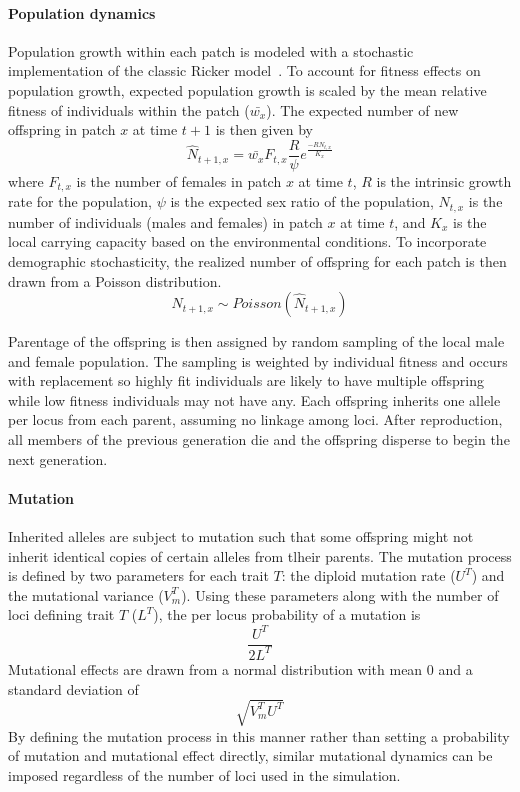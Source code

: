 \documentclass[11pt, oneside]{article}
\begin{document}
\paragraph{Population dynamics}
Population growth within each patch is modeled with a stochastic implementation of the classic Ricker model~\citep{ricker1954stock, melbourne2008extinction}. To account for fitness effects on population growth, expected population growth is scaled by the mean relative fitness of individuals within the patch ($\bar{w_{x}}$). The expected number of new offspring in patch $x$ at time $t+1$ is then given by
\begin{equation}
\hat{N}_{t+1,x}=\bar{w_{x}}F_{t,x}\frac{R}{\psi}e^{\frac{-RN_{t,x}}{K_{x}}}
\end{equation}
where $F_{t,x}$ is the number of females in patch $x$ at time $t$, $R$ is the intrinsic growth rate for the population, $\psi$ is the expected sex ratio of the population, $N_{t,x}$ is the number of individuals (males and females) in patch $x$ at time $t$, and $K_{x}$ is the local carrying capacity based on the environmental conditions. To incorporate demographic stochasticity, the realized number of offspring for each patch is then drawn from a Poisson distribution.
\begin{equation}
N_{t+1,x}\sim Poisson(\hat{N}_{t+1,x})
\end{equation}

Parentage of the offspring is then assigned by random sampling of the local male and female population. The sampling is weighted by individual fitness and occurs with replacement so highly fit individuals are likely to have multiple offspring while low fitness individuals may not have any. Each offspring inherits one allele per locus from each parent, assuming no linkage among loci. After reproduction, all members of the previous generation die and the offspring disperse to begin the next generation.

\paragraph{Mutation}
Inherited alleles are subject to mutation such that some offspring might not inherit identical copies of certain alleles from tlheir parents. The mutation process is defined by two parameters for each trait $T$: the diploid mutation rate ($U^{T}$) and the mutational variance ($V_{m}^{T}$). Using these parameters along with the number of loci defining trait $T$ ($L^{T}$), the per locus probability of a mutation is
\begin{equation}
\frac{U^{T}}{2L^{T}}
\end{equation}
Mutational effects are drawn from a normal distribution with mean $0$ and a standard deviation of
\begin{equation}
\sqrt{V_{m}^{T}U^{T}}
\end{equation}
By defining the mutation process in this manner rather than setting a probability of mutation and mutational effect directly, similar mutational dynamics can be imposed regardless of the number of loci used in the simulation.
\end{document}

